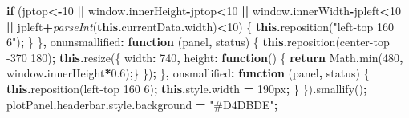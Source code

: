 \documentclass[
]{article}
\newenvironment{Shaded}{\begin{snugshade}}{\end{snugshade}}
\newcommand{\AttributeTok}[1]{\textcolor[rgb]{0.77,0.63,0.00}{#1}}
\newcommand{\BuiltInTok}[1]{#1}
\newcommand{\ControlFlowTok}[1]{\textcolor[rgb]{0.13,0.29,0.53}{\textbf{#1}}}
\newcommand{\DataTypeTok}[1]{\textcolor[rgb]{0.13,0.29,0.53}{#1}}
\newcommand{\DecValTok}[1]{\textcolor[rgb]{0.00,0.00,0.81}{#1}}
\newcommand{\FloatTok}[1]{\textcolor[rgb]{0.00,0.00,0.81}{#1}}
\newcommand{\FunctionTok}[1]{\textcolor[rgb]{0.00,0.00,0.00}{#1}}
\newcommand{\KeywordTok}[1]{\textcolor[rgb]{0.13,0.29,0.53}{\textbf{#1}}}
\newcommand{\NormalTok}[1]{#1}
\newcommand{\OperatorTok}[1]{\textcolor[rgb]{0.81,0.36,0.00}{\textbf{#1}}}
\newcommand{\PreprocessorTok}[1]{\textcolor[rgb]{0.56,0.35,0.01}{\textit{#1}}}
\newcommand{\StringTok}[1]{\textcolor[rgb]{0.31,0.60,0.02}{#1}}
\begin{document}
\begin{Shaded}
\begin{Highlighting}[]
      \ControlFlowTok{if}\NormalTok{ (jptop}\OperatorTok{\textless{}{-}}\DecValTok{10} \OperatorTok{||} \BuiltInTok{window}\OperatorTok{.}\AttributeTok{innerHeight}\OperatorTok{{-}}\NormalTok{jptop}\OperatorTok{\textless{}}\DecValTok{10} \OperatorTok{||} \BuiltInTok{window}\OperatorTok{.}\AttributeTok{innerWidth}\OperatorTok{{-}}\NormalTok{jpleft}\OperatorTok{\textless{}}\DecValTok{10} \OperatorTok{||}
\NormalTok{      jpleft}\OperatorTok{+}\PreprocessorTok{parseInt}\NormalTok{(}\KeywordTok{this}\OperatorTok{.}\AttributeTok{currentData}\OperatorTok{.}\AttributeTok{width}\NormalTok{)}\OperatorTok{\textless{}}\DecValTok{10}\NormalTok{) \{}
        \KeywordTok{this}\OperatorTok{.}\FunctionTok{reposition}\NormalTok{(}\StringTok{"left{-}top 160 6"}\NormalTok{)}\OperatorTok{;}
\NormalTok{      \}}
\NormalTok{    \}}\OperatorTok{,}
    \DataTypeTok{onunsmallified}\OperatorTok{:} \KeywordTok{function}\NormalTok{ (panel}\OperatorTok{,}\NormalTok{ status) \{}
      \KeywordTok{this}\OperatorTok{.}\FunctionTok{reposition}\NormalTok{(}\StringTok{\textquotesingle{}center{-}top {-}370 180\textquotesingle{}}\NormalTok{)}\OperatorTok{;}
      \KeywordTok{this}\OperatorTok{.}\FunctionTok{resize}\NormalTok{(\{ }\DataTypeTok{width}\OperatorTok{:} \DecValTok{740}\OperatorTok{,} \DataTypeTok{height}\OperatorTok{:} \KeywordTok{function}\NormalTok{() \{ }\ControlFlowTok{return} \BuiltInTok{Math}\OperatorTok{.}\FunctionTok{min}\NormalTok{(}\DecValTok{480}\OperatorTok{,} \BuiltInTok{window}\OperatorTok{.}\AttributeTok{innerHeight}\OperatorTok{*}\FloatTok{0.6}\NormalTok{)}\OperatorTok{;}\NormalTok{\} \})}\OperatorTok{;}
\NormalTok{    \}}\OperatorTok{,}
    \DataTypeTok{onsmallified}\OperatorTok{:} \KeywordTok{function}\NormalTok{ (panel}\OperatorTok{,}\NormalTok{ status) \{}
      \KeywordTok{this}\OperatorTok{.}\FunctionTok{reposition}\NormalTok{(}\StringTok{\textquotesingle{}left{-}top 160 6\textquotesingle{}}\NormalTok{)}\OperatorTok{;}
      \KeywordTok{this}\OperatorTok{.}\AttributeTok{style}\OperatorTok{.}\AttributeTok{width} \OperatorTok{=} \StringTok{\textquotesingle{}190px\textquotesingle{}}\OperatorTok{;}
\NormalTok{    \}}
\NormalTok{  \})}\OperatorTok{.}\FunctionTok{smallify}\NormalTok{()}\OperatorTok{;}
\NormalTok{  plotPanel}\OperatorTok{.}\AttributeTok{headerbar}\OperatorTok{.}\AttributeTok{style}\OperatorTok{.}\AttributeTok{background} \OperatorTok{=} \StringTok{"\#D4DBDE"}\OperatorTok{;}
\end{Highlighting}
\end{Shaded}
\end{document}
